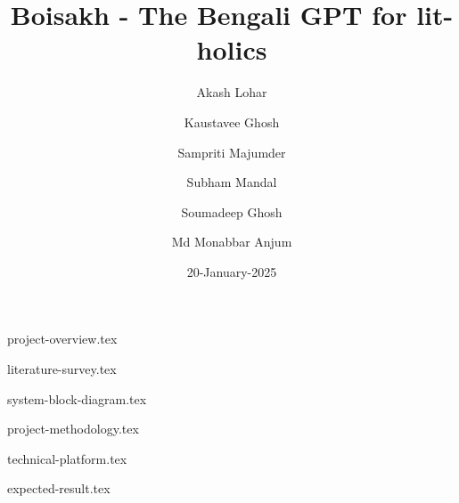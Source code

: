 \documentclass{article}
\title{Boisakh - The Bengali GPT for lit-holics}
\author{
    Akash Lohar \and
    Kaustavee Ghosh \and
    Sampriti Majumder \and
    Subham Mandal \and
    Soumadeep Ghosh \and
    Md Monabbar Anjum
}
\date{20-January-2025}
\begin{document}
\maketitle
\pagebreak
{}

\doublespace %
\tableofcontents
\singlespace %
\begin{appendix}
    \listoffigures
    \listoftables
\end{appendix}
\pagebreak

{project-overview.tex}

{literature-survey.tex}

{system-block-diagram.tex}

{project-methodology.tex}

{technical-platform.tex}

{expected-result.tex}

\newpage
{}


\end{document}
